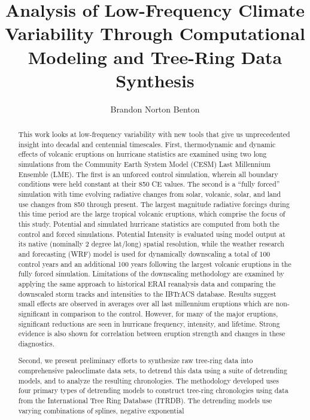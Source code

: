 \documentclass[phd,tocprelim]{cornell}
\title {Analysis of Low-Frequency Climate Variability Through 
Computational Modeling and Tree-Ring Data Synthesis}
\author {Brandon Norton Benton}
\begin{document}
\maketitle
\makecopyright

\begin{abstract}
  This work looks at low-frequency variability with new tools that 
  give us unprecedented insight into decadal and centennial timescales. 
  First, thermodynamic and dynamic effects of volcanic eruptions on hurricane
  statistics are examined using two long simulations from the
  Community Earth System Model (CESM) Last Millennium Ensemble
  (LME). The first is an unforced control simulation, wherein all
  boundary conditions were held constant at their 850 CE values. The
  second is a ``fully forced'' simulation with time evolving radiative
  changes from solar, volcanic, solar, and land use changes from 850
  through present. The largest magnitude radiative forcings during
  this time period are the large tropical volcanic eruptions, which
  comprise the focus of this study. Potential and simulated hurricane
  statistics are computed from both the control and forced
  simulations. Potential Intensity is evaluated using model output at
  its native (nominally 2 degree lat/long) spatial resolution, while
  the weather research and forecasting (WRF) model is used for
  dynamically downscaling a total of 100 control years and an
  additional 100 years following the largest volcanic eruptions in the
  fully forced simulation.  Limitations of the downscaling methodology
  are examined by applying the same approach to historical ERAI
  reanalysis data and comparing the downscaled storm tracks and
  intensities to the IBTrACS database. Results suggest small effects
  are observed in averages over all last millennium eruptions which
  are non-significant in comparison to the control. However, for many
  of the major eruptions, significant reductions are seen in hurricane
  frequency, intensity, and lifetime. Strong evidence is also shown
  for correlation between eruption strength and changes in these
  diagnostics.
\par
  Second, we present preliminary efforts to synthesize raw tree-ring data
  into comprehensive paleoclimate data sets, to detrend
  this data using a suite of detrending models, and to analyze the
  resulting chronologies. The methodology developed uses four primary types 
  of detrending models to construct tree-ring chronologies using 
  data from the International Tree Ring Database (ITRDB). The detrending 
  models use varying combinations of splines, negative exponential 

\end{abstract}
\end{document}

